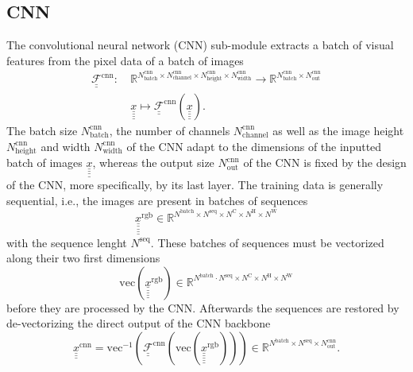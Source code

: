 \subsection*{CNN}
The convolutional neural network (CNN) sub-module
extracts a batch of visual features 
from the pixel data of a batch of images
\begin{align} \label{eq:CNN}
    \underline{\underline{ \mathcal{F} }}^\text{cnn}
    :\ 
    & 
    \mathbb{R}^{
        N^\text{cnn}_\text{batch} 
        \times
        N^\text{cnn}_\text{channel}
        \times
        N^\text{cnn}_\text{height}
        \times
        N^\text{cnn}_\text{width}
    } 
    \rightarrow 
    \mathbb{R}^{
        N^\text{cnn}_\text{batch}
        \times
        N^\text{cnn}_\text{out}
    }
    \nonumber \\
    &\underline{\underline{\underline{\underline x}}}
    \mapsto 
    \underline{\underline{ \mathcal{F} }}^\text{cnn} \left(
        \underline{\underline{\underline{\underline x}}}
    \right)
    .
\end{align}
The batch size 
$
    N^\text{cnn}_\text{batch}
$,
the number of channels
$
    N^\text{cnn}_\text{channel}
$
as well as the image height 
$
    N^\text{cnn}_\text{height}
$
and width
$
    N^\text{cnn}_\text{width}
$
of the CNN
adapt to the dimensions of the inputted batch of images
$
    \underline{\underline{\underline{\underline x}}}
$,
whereas the output size
$
    N^\text{cnn}_\text{out}
$
of the CNN
is fixed by the design of the CNN, 
more specifically, by its last layer.
The training data is generally sequential,
i.e., the images are present in batches of sequences
\begin{equation}
    \underline{\underline{\underline{\underline{\underline x}}}} ^\text{rgb}
    \in
    \mathbb{R}^{
        N^\text{batch} 
        \times
        N^\text{seq}
        \times
        N^\text{C}
        \times
        N^\text{H}
        \times
        N^\text{W}
    }
\end{equation}
with the sequence lenght $N^\text{seq}$.
These batches of sequences must be
vectorized along their two first dimensions
\begin{equation}
    \mathrm{vec} \left(
        \underline{\underline{\underline{\underline{\underline x}}}} ^\text{rgb}   
    \right)
    \in
    \mathbb{R}^{
        N^\text{batch} 
        \cdot
        N^\text{seq}
        \times
        N^\text{C}
        \times
        N^\text{H}
        \times
        N^\text{W}
    }
\end{equation}
before they are processed by the CNN.
Afterwards the sequences are restored 
by de-vectorizing the direct output of the CNN backbone 
\begin{equation}
    \underline{\underline{\underline{x}}}^\text{cnn}
    =
    \mathrm{vec}^{-1} \left(
        \underline{\underline{ \mathcal{F} }}^\text{cnn} \left(
            \mathrm{vec} \left(
                \underline{\underline{\underline{\underline{\underline x}}}} ^\text{rgb}   
            \right)
        \right)
    \right)
    \in
    \mathbb{R}^{
        N^\text{batch} 
        \times
        N^\text{seq}
        \times
        N^\text{cnn}_\text{out}
    }.
\end{equation}

